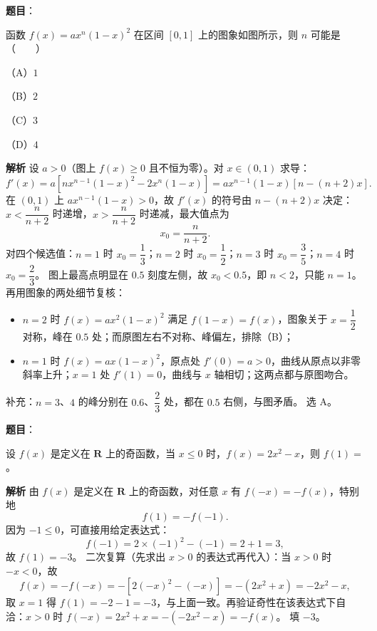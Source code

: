 \begin{answer}

\textbf{题目}：

函数 $f(x)=ax^n(1-x)^2$ 在区间 $[0,1]$ 上的图象如图所示，则 $n$ 可能是\mbox{（　　）}

（A）$1$

（B）$2$

（C）$3$

（D）$4$
\nopagebreak[4]
\begin{center}\end{center}
\nopagebreak[4]
\textbf{解析}
设 $a>0$（图上 $f(x)\geqslant0$ 且不恒为零）。对 $x\in(0,1)$ 求导：
\nopagebreak[4]
\[
f'(x)=a\left[nx^{n-1}(1-x)^2-2x^n(1-x)\right]=ax^{n-1}(1-x)\left[n-(n+2)x\right].
\]
在 $(0,1)$ 上 $ax^{n-1}(1-x)>0$，故 $f'(x)$ 的符号由 $n-(n+2)x$ 决定：$x<\dfrac{n}{n+2}$ 时递增，$x>\dfrac{n}{n+2}$ 时递减，最大值点为
\nopagebreak[4]
\[
x_0=\frac{n}{n+2}.
\]
对四个候选值：$n=1$ 时 $x_0=\dfrac13$；$n=2$ 时 $x_0=\dfrac12$；$n=3$ 时 $x_0=\dfrac35$；$n=4$ 时 $x_0=\dfrac23$。
图上最高点明显在 $0.5$ 刻度左侧，故 $x_0<0.5$，即 $n<2$，只能 $n=1$。
再用图象的两处细节复核：
\begin{itemize}
\item $n=2$ 时 $f(x)=ax^2(1-x)^2$ 满足 $f(1-x)=f(x)$，图象关于 $x=\dfrac12$ 对称，峰在 $0.5$ 处；而原图左右不对称、峰偏左，排除（B）；
\item $n=1$ 时 $f(x)=ax(1-x)^2$，原点处 $f'(0)=a>0$，曲线从原点以非零斜率上升；$x=1$ 处 $f'(1)=0$，曲线与 $x$ 轴相切；这两点都与原图吻合。
\end{itemize}
补充：$n=3$、$4$ 的峰分别在 $0.6$、$\dfrac23$ 处，都在 $0.5$ 右侧，与图矛盾。
选 A。


\end{answer}
\begin{answer}

\textbf{题目}：

设 $f(x)$ 是定义在 $\mathbf R$ 上的奇函数，当 $x\leqslant0$ 时，$f(x)=2x^2-x$，则 $f(1)=$\gkblank{}。

\textbf{解析}
由 $f(x)$ 是定义在 $\mathbf R$ 上的奇函数，对任意 $x$ 有 $f(-x)=-f(x)$，特别地
\nopagebreak[4]
\[
f(1)=-f(-1).
\]
因为 $-1\leqslant0$，可直接用给定表达式：
\nopagebreak[4]
\[
f(-1)=2\times(-1)^2-(-1)=2+1=3,
\]
故 $f(1)=-3$。
二次复算（先求出 $x>0$ 的表达式再代入）：当 $x>0$ 时 $-x<0$，故
\nopagebreak[4]
\[
f(x)=-f(-x)=-\left[2(-x)^2-(-x)\right]=-\left(2x^2+x\right)=-2x^2-x,
\]
取 $x=1$ 得 $f(1)=-2-1=-3$，与上面一致。再验证奇性在该表达式下自洽：$x>0$ 时 $f(-x)=2x^2+x=-\left(-2x^2-x\right)=-f(x)$。
填 $-3$。


\end{answer}
